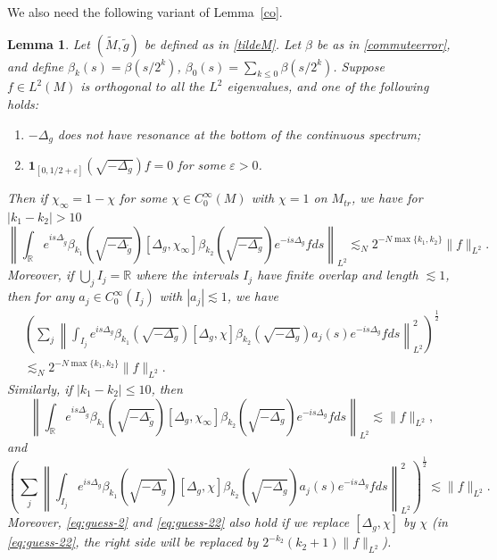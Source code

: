 \documentclass[10pt]{amsart}
\renewcommand{\epsilon}{\varepsilon}
\newtheorem{lemma}[theorem]{Lemma}
\newcommand{\1}{{\bf 1}}
\renewcommand{\epsilon}{\varepsilon}
\begin{document}
We also need the following variant of Lemma~\ref{co}.
\begin{lemma}\label{lem:loc-sm-diff}
Let $(\tilde M,\tilde g)$ be defined as in \eqref{tildeM}. Let $\beta$ be as in \eqref{commuteerror}, and define $\beta_k(s)=\beta(s/2^k)$, $\beta_0(s)= \sum_{k\le 0} \beta(s/2^k)$.
 Suppose $f\in L^2(M)$ is orthogonal to all the $L^2$ eigenvalues, and one of the following holds:
\begin{enumerate}
    \item $-\Delta_g$ does not have resonance at the bottom of the continuous spectrum;
    \item $\mathbf{1}_{[0,1/2+\epsilon]}(\sqrt{-\Delta_g})f=0$ for some $\epsilon>0$. 
\end{enumerate}
Then if $\chi_\infty=1-\chi$ for some $\chi \in C_0^{\infty}(M)$ with $\chi=1$ on $M_{tr}$, we have for $|k_1-k_2|> 10$
\begin{equation}\label{eq:guess}
   \left\| \int_{\mathbb{R}} e^{is\Delta_{\tilde{g}}} \beta_{k_1}(\sqrt{-\Delta_{\tilde{g}}})[\Delta_g,\chi_\infty] \beta_{k_2}(\sqrt{-\Delta_{g}}) e^{-is\Delta_g}f ds \right\|_{L^2}\lesssim_N 2^{-N\max\{k_1,k_2\}} \|f\|_{L^2}.
\end{equation}
Moreover, if $\bigcup_{j} I_j=\mathbb R$ where the intervals $I_j$ have finite overlap and length $\lesssim 1$, then for any $a_j\in C_0^\infty(I_j)$ with $|a_j|\lesssim 1$, we have
\begin{multline}\label{eq:guess-2}
  \left( \sum_{j}  \left\| \int_{I_j} e^{is\Delta_{g}} \beta_{k_1}(\sqrt{-\Delta_{g}})[\Delta_g,\chi] \beta_{k_2}(\sqrt{-\Delta_{g}}) a_j(s)e^{-is\Delta_g}f ds \right\|^2_{L^2}\right)^{\frac12}\\
  \lesssim_N     2^{-N\max\{k_1,k_2\}}    \|f\|_{L^2}.
\end{multline}
Similarly, if $|k_1-k_2|\le 10$, then
\begin{equation}\label{eq:guess1}
 \left\| \int_{\mathbb{R}} e^{is\Delta_{\tilde{g}}} \beta_{k_1}(\sqrt{-\Delta_{\tilde{g}}})[\Delta_g,\chi_\infty] \beta_{k_2}(\sqrt{-\Delta_{g}}) e^{-is\Delta_g}f ds \right\|_{L^2}\lesssim  \|f\|_{L^2},
\end{equation}
and 
\begin{equation}\label{eq:guess-22}
    \left( \sum_{j} \left\| \int_{I_j} e^{is\Delta_{g}} \beta_{k_1}(\sqrt{-\Delta_{g}})[\Delta_g,\chi] \beta_{k_2}(\sqrt{-\Delta_{g}}) a_j(s)e^{-is\Delta_g}f ds \right\|^2_{L^2}\right)^{\frac12}\lesssim \|f\|_{L^2}.
\end{equation}
Moreover, \eqref{eq:guess-2} and  \eqref{eq:guess-22} also hold if we replace $[\Delta_g,\chi]$ by $\chi$ (in \eqref{eq:guess-22}, the right side will be replaced by $2^{-k_2}(k_2+1)\|f\|_{L^2}$).
\end{lemma}
\end{document}
